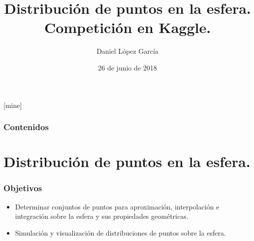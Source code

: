 \documentclass{beamer}
\title[Distribución de puntos en la esfera.Competición en Kaggle.]{Distribución de puntos en la esfera.\\ Competición en Kaggle.} %
\author{Daniel López García} %
\institute[UGR] %
{
  Universidad de Granada \\ %
}
\date{26 de junio de 2018} %
\theoremstyle{plain}
\theoremstyle{definition}
\theoremstyle{plain}
\theoremstyle{definition}
\theoremstyle{remark}
\theoremstyle{definition}
\begin{document}
\theoremstyle{definition}
[mine]

\frame{\titlepage}

\begin{frame}
  \frametitle{Contenidos} %
  \tableofcontents
\end{frame}



\section{Distribución de puntos en la esfera.} %
\begin{frame}
	
	\frametitle{Objetivos}
	\begin{itemize}
		\item Determinar conjuntos de puntos
		para aproximación, interpolación e integración sobre la esfera y sus propiedades geométricas.
		\item Simulación y visualización de distribuciones de puntos sobre la esfera.
	\end{itemize}
	
\end{frame}
\end{document}
